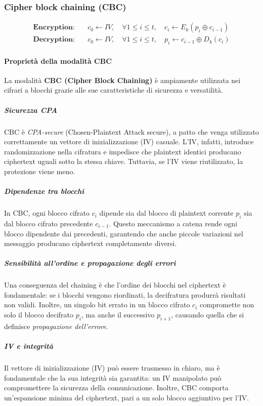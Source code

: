 \documentclass{report}
\begin{document}
\subsubsection{Cipher block chaining (CBC)}

\begin{align*}
    \textbf{Encryption:} \quad & c_0 \leftarrow IV,\quad \forall 1 \leq i \leq t,\quad c_i \leftarrow E_k(p_i \oplus c_{i-1}) \\
    \textbf{Decryption:} \quad & c_0 \leftarrow IV,\quad \forall 1 \leq i \leq t,\quad p_i \leftarrow c_{i-1} \oplus D_k(c_i)
    \end{align*}
    

    \paragraph{Proprietà della modalità CBC}

    La modalità \textbf{CBC (Cipher Block Chaining)} è ampiamente utilizzata nei cifrari a blocchi grazie alle sue caratteristiche di sicurezza e versatilità.
    
    \subparagraph{Sicurezza CPA}
    CBC è \textit{CPA-secure} (Chosen-Plaintext Attack secure), a patto che venga utilizzato correttamente un vettore di inizializzazione (IV) casuale. L'IV, infatti, introduce randomizzazione nella cifratura e impedisce che plaintext identici producano ciphertext uguali sotto la stessa chiave. Tuttavia, se l'IV viene riutilizzato, la protezione viene meno.
    
    \subparagraph{Dipendenze tra blocchi}
    In CBC, ogni blocco cifrato $c_i$ dipende sia dal blocco di plaintext corrente $p_i$ sia dal blocco cifrato precedente $c_{i-1}$. Questo meccanismo a catena rende ogni blocco dipendente dai precedenti, garantendo che anche piccole variazioni nel messaggio producano ciphertext completamente diversi.
    
    \subparagraph{Sensibilità all'ordine e propagazione degli errori}
    Una conseguenza del chaining è che l’ordine dei blocchi nel ciphertext è fondamentale: se i blocchi vengono riordinati, la decifratura produrrà risultati non validi. Inoltre, un singolo bit errato in un blocco cifrato $c_i$ compromette non solo il blocco decifrato $p_i$, ma anche il successivo $p_{i+1}$, causando quella che si definisce \textit{propagazione dell’errore}.
    
    \subparagraph{IV e integrità}
    Il vettore di inizializzazione (IV) può essere trasmesso in chiaro, ma è fondamentale che la sua integrità sia garantita: un IV manipolato può compromettere la sicurezza della comunicazione. Inoltre, CBC comporta un'espansione minima del ciphertext, pari a un solo blocco aggiuntivo per l'IV.
    
\end{document}
